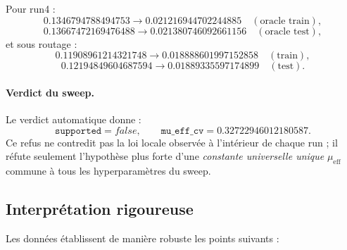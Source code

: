 Pour run4 :
\[
0.1346794788494753 \to 0.021216944702244885\quad(\text{oracle train}),
\]
\[
0.13667472169476488 \to 0.021380746092661156\quad(\text{oracle test}),
\]
et sous routage :
\[
0.11908961214321748 \to 0.018888601997152858\quad(\text{train}),
\]
\[
0.12194849604687594 \to 0.01889335597174899\quad(\text{test}).
\]

\paragraph{Verdict du sweep.}
Le verdict automatique donne :
\[
\texttt{supported}=false,
\qquad
\texttt{mu\_eff\_cv}=0.32722946012180587.
\]
Ce refus ne contredit pas la loi locale observée à l’intérieur de chaque run ; il réfute seulement l’hypothèse plus forte d’une \emph{constante universelle unique} \(\mu_{\mathrm{eff}}\) commune à tous les hyperparamètres du sweep.

\subsection{Interprétation rigoureuse}

Les données établissent de manière robuste les points suivants :

